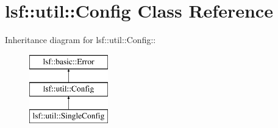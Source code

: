 \hypertarget{classlsf_1_1util_1_1Config}{
\section{lsf::util::Config Class Reference}
\label{classlsf_1_1util_1_1Config}
}
Inheritance diagram for lsf::util::Config::\begin{figure}[H]
\begin{center}
\leavevmode
\includegraphics[height=3cm]{classlsf_1_1util_1_1Config}
\end{center}
\end{figure}
